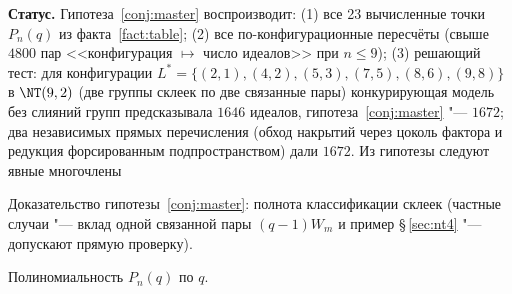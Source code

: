 \textbf{Статус.} Гипотеза~\ref{conj:master} воспроизводит:
(1) все 23 вычисленные точки $P_n(q)$ из факта~\ref{fact:table};
(2) все по-конфигурационные пересчёты (свыше $4800$ пар <<конфигурация
$\mapsto$ число идеалов>> при $n\leq 9$);
(3) решающий тест: для конфигурации
$L^{*}=\{(2,1),(4,2),(5,3),(7,5),(8,6),(9,8)\}$ в $\NT(9,2)$ (две
группы склеек по две связанные пары) конкурирующая модель без слияний групп
предсказывала $1646$ идеалов, гипотеза~\ref{conj:master} "--- $1672$;
два независимых прямых перечисления (обход накрытий через цоколь фактора и
редукция форсированным подпространством) дали $1672$.
Из гипотезы следуют явные многочлены


\item Доказательство гипотезы~\ref{conj:master}: полнота классификации
склеек (частные случаи "--- вклад одной связанной пары $(q-1)W_m$ и
пример \S\,\ref{sec:nt4} "--- допускают прямую проверку).
\item Полиномиальность $P_n(q)$ по $q$.
